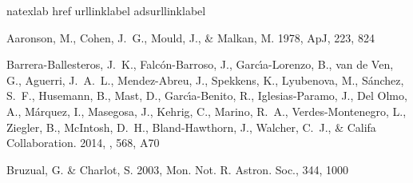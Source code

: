 \begin{thebibliography}


\expandafter\ifx\csname natexlab\endcsname\relax\def\natexlab#1{#1}\fi
\expandafter\ifx\csname href\endcsname\relax
  \def\href#1#2{}\fi
\expandafter\ifx\csname urllinklabel\endcsname\relax
  \def\urllinklabel{[LINK]}\fi
\expandafter\ifx\csname adsurllinklabel\endcsname\relax
  \def\adsurllinklabel{[ADS]}\fi

Aaronson, M., Cohen, J.~G., Mould, J., \& Malkan, M. 1978, ApJ, 223, 824
 \href{http://adsabs.harvard.edu/cgi-bin/nph-data_query?bibcode=1978ApJ...223.%
.824A&link_type=ABSTRACT}{\urllinklabel}

{Barrera-Ballesteros}, J.~K., {Falc{\'o}n-Barroso}, J.,
  {Garc{\'{\i}}a-Lorenzo}, B., {van de Ven}, G., {Aguerri}, J.~A.~L.,
  {Mendez-Abreu}, J., {Spekkens}, K., {Lyubenova}, M., {S{\'a}nchez}, S.~F.,
  {Husemann}, B., {Mast}, D., {Garc{\'{\i}}a-Benito}, R., {Iglesias-Paramo},
  J., {Del Olmo}, A., {M{\'a}rquez}, I., {Masegosa}, J., {Kehrig}, C.,
  {Marino}, R.~A., {Verdes-Montenegro}, L., {Ziegler}, B., {McIntosh}, D.~H.,
  {Bland-Hawthorn}, J., {Walcher}, C.~J., \& {Califa Collaboration}. 2014,
  \aap, 568, A70


Bruzual, G. \& Charlot, S. 2003, Mon. Not. R. Astron. Soc., 344, 1000
 \href{http://adsabs.harvard.edu/cgi-bin/nph-data_query?bibcode=2003MNRAS.344.%
1000B&link_type=ABSTRACT}{\urllinklabel}


\end{thebibliography}
